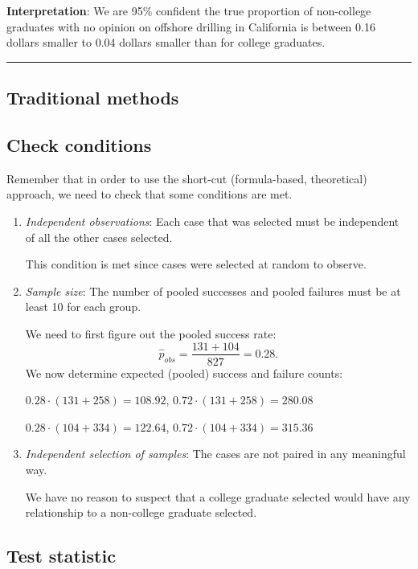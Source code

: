 \documentclass[12pt, krantz2,]{krantz}
\begin{document}
\textbf{Interpretation}: We are 95\% confident the true proportion of non-college graduates with no opinion on offshore drilling in California is between 0.16 dollars smaller to 0.04 dollars smaller than for college graduates.

\begin{center}\rule{0.5\linewidth}{\linethickness}\end{center}

\hypertarget{traditional-methods-2}{%
\subsection{Traditional methods}\label{traditional-methods-2}}

\hypertarget{check-conditions-2}{%
\subsection{Check conditions}\label{check-conditions-2}}

Remember that in order to use the short-cut (formula-based, theoretical) approach, we need to check that some conditions are met.

\begin{enumerate}
\def\labelenumi{\arabic{enumi}.}
\item
  \emph{Independent observations}: Each case that was selected must be independent of all the other cases selected.

  This condition is met since cases were selected at random to observe.
\item
  \emph{Sample size}: The number of pooled successes and pooled failures must be at least 10 for each group.

  We need to first figure out the pooled success rate: \[\hat{p}_{obs} = \dfrac{131 + 104}{827} = 0.28.\] We now determine expected (pooled) success and failure counts:

  \(0.28 \cdot (131 + 258) = 108.92\), \(0.72 \cdot (131 + 258) = 280.08\)

  \(0.28 \cdot (104 + 334) = 122.64\), \(0.72 \cdot (104 + 334) = 315.36\)
\item
  \emph{Independent selection of samples}: The cases are not paired in any meaningful way.

  We have no reason to suspect that a college graduate selected would have any relationship to a non-college graduate selected.
\end{enumerate}

\hypertarget{test-statistic-2}{%
\subsection{Test statistic}\label{test-statistic-2}}
\end{document}
